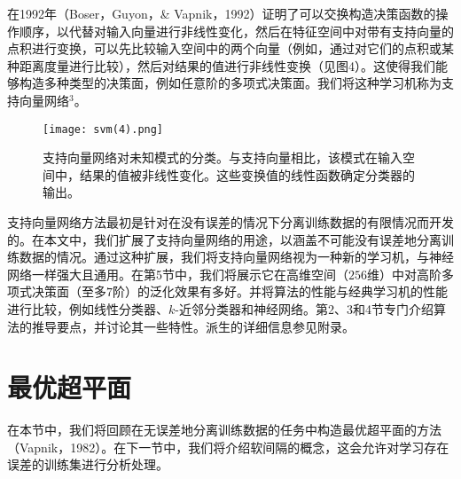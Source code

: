 \documentclass[lang=cn,11pt,a4paper]{elegantpaper}
\begin{document}
	在1992年（Boser，Guyon，\& Vapnik，1992）证明了可以交换构造决策函数的操作顺序，以代替对输入向量进行非线性变化，然后在特征空间中对带有支持向量的点积进行变换，可以先比较输入空间中的两个向量（例如，通过对它们的点积或某种距离度量进行比较），然后对结果的值进行非线性变换（见图4）。这使得我们能够构造多种类型的决策面，例如任意阶的多项式决策面。我们将这种学习机称为支持向量网络$^3$。
	\begin{figure}[htbp]
		\centering
		\texttt{[image: svm(4).png]}
		\caption{支持向量网络对未知模式的分类。与支持向量相比，该模式在输入空间中，结果的值被非线性变化。这些变换值的线性函数确定分类器的输出。}
	\end{figure}
	支持向量网络方法最初是针对在没有误差的情况下分离训练数据的有限情况而开发的。在本文中，我们扩展了支持向量网络的用途，以涵盖不可能没有误差地分离训练数据的情况。通过这种扩展，我们将支持向量网络视为一种新的学习机，与神经网络一样强大且通用。在第5节中，我们将展示它在高维空间（$256$维）中对高阶多项式决策面（至多$7$阶）的泛化效果有多好。并将算法的性能与经典学习机的性能进行比较，例如线性分类器、$k$-近邻分类器和神经网络。第2、3和4节专门介绍算法的推导要点，并讨论其一些特性。派生的详细信息参见附录。

	\section{最优超平面}
	在本节中，我们将回顾在无误差地分离训练数据的任务中构造最优超平面的方法（Vapnik，1982）。在下一节中，我们将介绍软间隔的概念，这会允许对学习存在误差的训练集进行分析处理。
\end{document}
